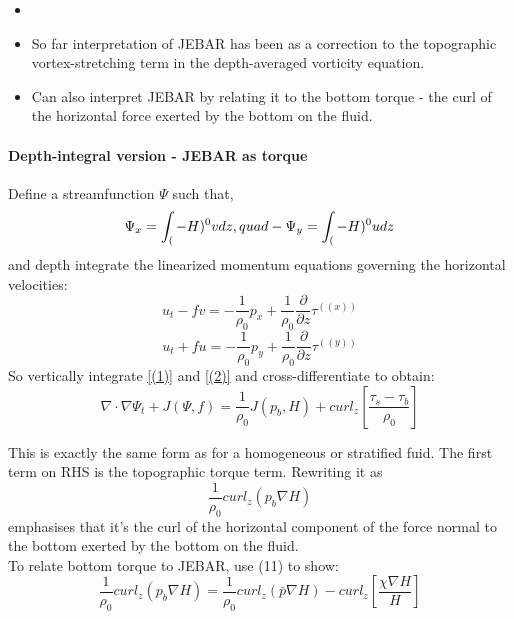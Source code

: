 \documentclass[..\Papers.tex]{subfiles}
\begin{document}
\begin{itemize}
    \item 
    \item So far interpretation of JEBAR has been as a correction to the topographic vortex-stretching term in the depth-averaged vorticity equation.
    \item Can also interpret JEBAR by relating it to the bottom torque - the curl of the horizontal force exerted by the bottom on the fluid.

\end{itemize}

\paragraph{Depth-integral version - JEBAR as torque}
Define a streamfunction $\Psi$ such that,
\begin{equation}
    \Psi_x = \int_(-H)^0 v dz,\\quad -\Psi_y = \int_(-H)^0 u dz
\end{equation}
and depth integrate the linearized momentum equations governing the horizontal velocities:
\begin{equation}\label{(1)}
    u_t-fv=-\frac{1}{\rho_0}p_x+\frac{1}{\rho_0}\frac{\partial}{\partial z}\tau^((x))
\end{equation}
\begin{equation}\label{(2)}
    u_t+fu=-\frac{1}{\rho_0}p_y+\frac{1}{\rho_0}\frac{\partial}{\partial z}\tau^((y))
\end{equation}
So vertically integrate \ref{(1)} and \ref{(2)} and cross-differentiate to obtain:
\begin{equation}\label{(14)}
    \nabla\cdot\nabla\Psi_t+J(\Psi,f)=\frac{1}{\rho_0}J(p_b,H)+curl_z[\frac{\tau_s-\tau_b}{\rho_0}]
\end{equation}

This is exactly the same form as for a homogeneous or stratified fuid. The first term on RHS is the topographic torque term. Rewriting it as 
\begin{equation}
    \frac{1}{\rho_0}curl_z(p_b\nabla H)
\end{equation}
emphasises that it's the curl of the horizontal component of the force normal to the bottom exerted by the bottom on the fluid. \\ 
To relate bottom torque to JEBAR, use (11) to show:
\begin{equation}
    \frac{1}{\rho_0}curl_z(p_b\nabla H) = \frac{1}{\rho_0}curl_z(\bar{p}\nabla H)-curl_z[\frac{\chi \nabla H}{H}]
\end{equation}
\end{document}
